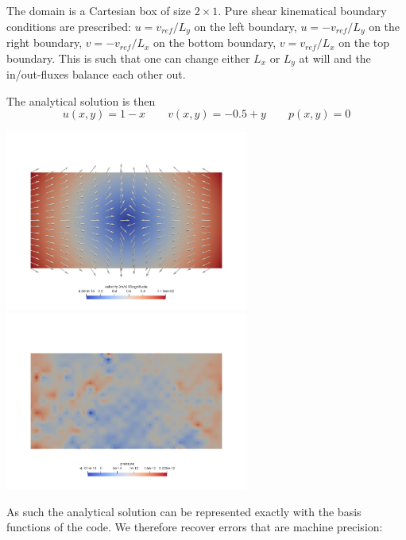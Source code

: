 \documentclass[a4paper]{article}
\begin{document}
The domain is a Cartesian box of size $2\times 1$.
Pure shear kinematical boundary conditions are prescribed:
$u=v_{ref}/L_y$ on the left boundary, 
$u=-v_{ref}/L_y$ on the right boundary, 
$v=-v_{ref}/L_x$ on the bottom boundary, 
$v=v_{ref}/L_x$ on the top boundary.
This is such that one can change either $L_x$ or $L_y$
at will and the in/out-fluxes balance each other out. 

The analytical solution is then
\[
u(x,y)=1-x
\qquad
v(x,y)=-0.5+y
\qquad
p(x,y)=0
\]

\begin{center}
\includegraphics[width=8cm]{./results/benchmark_pure_shear/vel}
\includegraphics[width=8cm]{./results/benchmark_pure_shear/press}
\end{center}

As such the analytical solution can be represented exactly
with the basis functions of the code.
We therefore recover errors that are machine precision:
\end{document}
